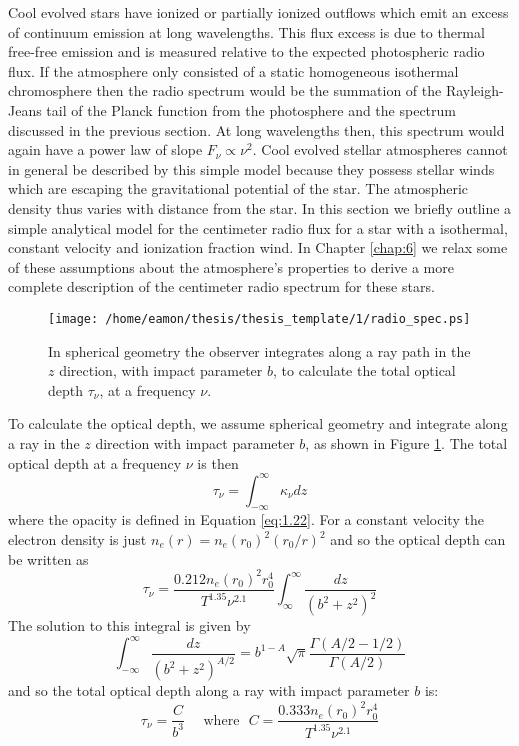 Cool evolved stars have ionized or partially ionized outflows which emit an excess of continuum emission at long wavelengths. This flux excess is due to thermal free-free emission and is measured relative to the expected photospheric radio flux. If the atmosphere only consisted of a static homogeneous isothermal chromosphere then the radio spectrum would be the summation of the Rayleigh-Jeans tail of the Planck function from the photosphere and the  spectrum discussed in the previous section. At long wavelengths then, this spectrum would again have a power law of slope $F_{\nu} \propto \nu ^{2}$. Cool evolved stellar atmospheres cannot in general be described by this simple model because they possess stellar winds which are escaping the gravitational potential of the star. The atmospheric density thus varies with distance from the star. In this section we briefly outline a simple analytical model for the centimeter radio flux for a star with a isothermal, constant velocity and ionization fraction wind. In Chapter \ref{chap:6} we relax some of these assumptions about the atmosphere's properties to derive a more complete description of the centimeter radio spectrum for these stars.

\begin{figure}[hbt!]\label{fig:1.5.4}
\centering 
          \texttt{[image: /home/eamon/thesis/thesis\_template/1/radio\_spec.ps]}
\caption[]{In spherical geometry the observer integrates along a ray path in the $z$ direction, with impact parameter $b$, to calculate the total optical depth $\tau _{\nu}$, at a frequency $\nu$.}
\label{fig:1.5.4}
\end{figure}

To calculate the optical depth, we assume spherical geometry and integrate along a ray in the $z$ direction with impact parameter $b$, as shown in Figure \ref{fig:1.5.4}. The total optical depth at a frequency $\nu$ is then
\begin{equation}
\tau _{\nu} = \int ^{\infty} _{-\infty} \kappa _{\nu} dz
\end{equation}
where the opacity is defined in Equation \ref{eq:1.22}. For a constant velocity the electron density is just $n_{e}(r)=n_{e}(r_{0})^2(r_{0}/r)^2$ and so the optical depth can be written as
\begin{equation}
\tau _{\nu} = \frac{0.212n_{e}(r_{0})^2r_{0}^4}{T^{1.35}\nu ^{2.1}}\int ^{\infty} _{\infty}\frac{dz}{(b^2 + z^2)^2}
\end{equation}
The solution to this integral is given by
\begin{equation}
\int ^{\infty} _{-\infty} \frac{dz}{(b^2 + z^2)^{A/2}}=b^{1-A}\sqrt{\pi}\frac{\Gamma (A/2 -1/2)}{\Gamma (A/2)}
\end{equation}
and so the total optical depth along a ray with impact parameter $b$ is:
\begin{equation}
\tau _{\nu} = \frac{C}{b^3}\ \ \ \ \ \ \mathrm{where}\ \ \ C=\frac{0.333n_{e}(r_{0})^2r_{0}^4}{T^{1.35}\nu ^{2.1}}
\end{equation}

